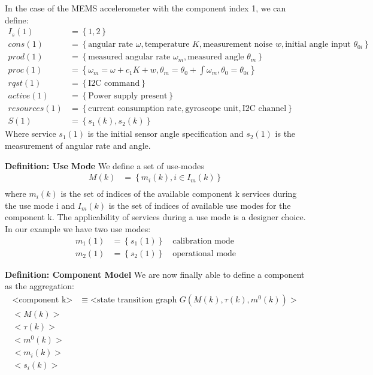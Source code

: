 In the case of the MEMS accelerometer with the component index 1, we can define:
\begin{align*}
I_s(1) &= \left\{1,2\right\} \\
cons(1) &= \left\{\text{angular rate }\omega, \text{temperature }K, \text{measurement noise }w, \text{initial angle input }\theta_{0i}\right\} \\
prod(1) &= \left\{\text{measured angular rate }\omega_m, \text{measured angle }\theta_m\right\} \\
proc(1) &= \left\{ \omega_m = \omega + c_1K + w, \theta_m = \theta_0 + \int\omega_m, \theta_0 = \theta_{0i}\right\} \\
rqst(1) &= \left\{ \text{I2C command}\right\} \\
active(1) &= \left\{ \text{Power supply present}\right\} \\
resources(1) &= \left\{ \text{current consumption rate}, \text{gyroscope unit}, \text{I2C channel}\right\} \\
S(1) &= \left\{s_1(k),s_2(k)\right\}
\end{align*}
Where service $s_1(1)$ is the initial sensor angle specification and $s_2(1)$ is the measurement of angular rate and angle.

\textbf{Definition: Use Mode}
We define a set of use-modes
\begin{align*}
M(k) &= \left\{m_i(k), i\in I_m(k)\right\} \\
\end{align*}
where $m_i(k)$ is the set of indices of the available component k services during the use mode i and $I_m(k)$ is the set of indices of available use modes for the component k. The applicability of services during a use mode is a designer choice.
In our example we have two use modes:
\begin{align*}
m_1(1) &= \left\{s_1(1)\right\} \quad \text{calibration mode}\\
m_2(1) &= \left\{s_2(1)\right\} \quad \text{operational mode}
\end{align*}

\textbf{Definition: Component Model}
We are now finally able to define a component as the aggregation:
\begin{align*}
\text{<component k>} &\equiv \text{<state transition graph }G(M(k),\tau(k),m^0(k))> \\
<M(k)> & \\
<\tau(k)> & \\
<m^0(k)> & \\
<m_i(k)> & \\
<s_i(k)> & \\
\end{align*}

